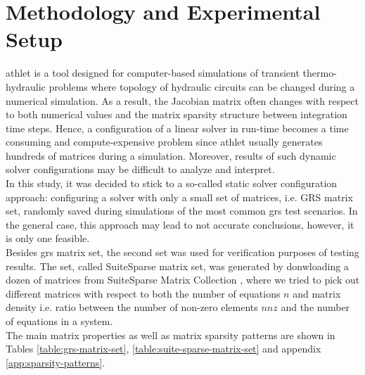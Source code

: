 \chapter{Methodology and Experimental Setup}\label{subseq:matrix-sets-and-hardware}

\acrshort{athlet} is a tool designed for computer-based simulations of transient thermo-hydraulic problems where topology of hydraulic circuits can be changed during a numerical simulation. As a result, the Jacobian matrix often changes with respect to both numerical values and the matrix sparsity structure between integration time steps. Hence, a configuration of a linear solver in run-time becomes a time consuming and compute-expensive problem since \acrshort{athlet} usually generates hundreds of matrices during a simulation. Moreover, results of such dynamic solver configurations may be difficult to analyze and interpret.\\


In this study, it was decided to stick to a so-called static solver configuration approach: configuring a solver with only a small set of matrices, i.e. GRS matrix set, randomly saved during simulations of the most common \acrshort{grs} test scenarios. In the general case, this approach may lead to not accurate conclusions, however, it is only one feasible.\\


Besides \acrshort{grs} matrix set, the second set was  used for verification purposes of testing results. The set, called SuiteSparse matrix set, was generated by donwloading a dozen of matrices from SuiteSparse Matrix Collection \cite{sparse-matrix-collection:1}, \cite{sparse-matrix-collection:2} where we tried to pick out different matrices with respect to both the number of equations $n$ and matrix density i.e. ratio between the number of non-zero elements $nnz$ and the number of equations in a system.\\ 


The main matrix properties as well as matrix sparsity patterns are shown in Tables \ref{table:grs-matrix-set}, \ref{table:suite-sparse-matrix-set} and appendix \ref{app:sparsity-patterns}.\\


